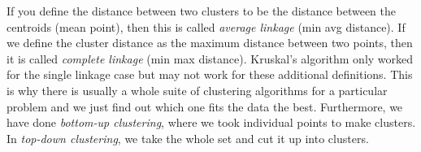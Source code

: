     If you define the distance between two clusters to be the distance between the centroids (mean point), then this is called \textit{average linkage} (min avg distance). If we define the cluster distance as the maximum distance between two points, then it is called \textit{complete linkage} (min max distance). Kruskal's algorithm only worked for the single linkage case but may not work for these additional definitions. This is why there is usually a whole suite of clustering algorithms for a particular problem and we just find out which one fits the data the best. Furthermore, we have done \textit{bottom-up clustering}, where we took individual points to make clusters. In \textit{top-down clustering}, we take the whole set and cut it up into clusters.  


